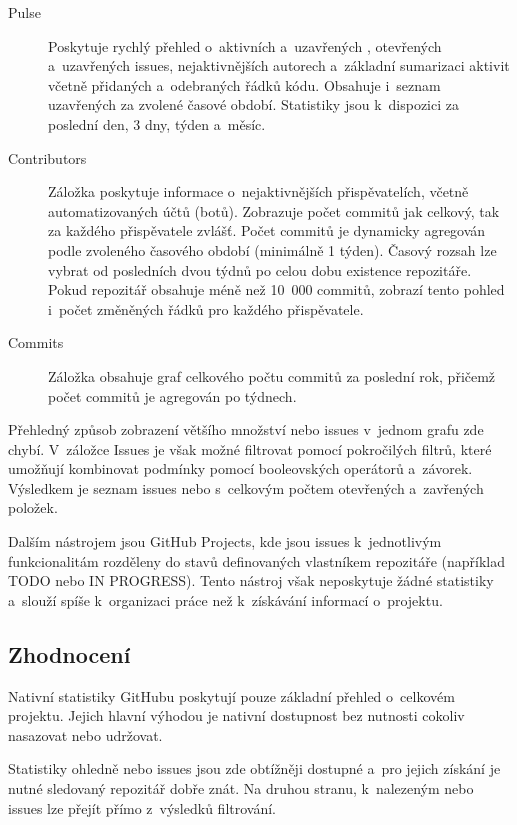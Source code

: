 \begin{description}
  \item[Pulse] Poskytuje rychlý přehled o~aktivních a~uzavřených \PR, otevřených a~uzavřených issues, nejaktivnějších autorech a~základní sumarizaci aktivit včetně přidaných a~odebraných řádků kódu. Obsahuje i~seznam uzavřených \PR za zvolené časové období. Statistiky jsou k~dispozici za poslední den, 3 dny, týden a~měsíc.
  \item[Contributors] Záložka poskytuje informace o~nejaktivnějších přispěvatelích, včetně automatizovaných účtů (botů). Zobrazuje počet commitů jak celkový, tak za každého přispěvatele zvlášť. Počet commitů je dynamicky agregován podle zvoleného časového období (minimálně 1 týden). Časový rozsah lze vybrat od posledních dvou týdnů po celou dobu existence repozitáře. Pokud repozitář obsahuje méně než 10~000 commitů, zobrazí tento pohled i~počet změněných řádků pro každého přispěvatele.
  \item[Commits] Záložka obsahuje graf celkového počtu commitů za poslední rok, přičemž počet commitů je agregován po týdnech.
\end{description}

Přehledný způsob zobrazení většího množství \PR nebo issues v~jednom grafu zde chybí. V~záložce Issues je však možné filtrovat pomocí pokročilých filtrů, které umožňují kombinovat podmínky pomocí booleovských operátorů a~závorek. Výsledkem je seznam issues nebo \PR s~celkovým počtem otevřených a~zavřených položek.

Dalším nástrojem jsou GitHub Projects, kde jsou issues k~jednotlivým funkcionalitám rozděleny do stavů definovaných vlastníkem repozitáře (například TODO nebo IN PROGRESS). Tento nástroj však neposkytuje žádné statistiky a~slouží spíše k~organizaci práce než k~získávání informací o~projektu.

\subsection*{Zhodnocení}
\label{subsec:github_stats:evaluation}

Nativní statistiky GitHubu poskytují pouze základní přehled o~celkovém projektu. Jejich hlavní výhodou je nativní dostupnost bez nutnosti cokoliv nasazovat nebo udržovat.

Statistiky ohledně \PR nebo issues jsou zde obtížněji dostupné a~pro jejich získání je nutné sledovaný repozitář dobře znát. Na druhou stranu, k~nalezeným \PR nebo issues lze přejít přímo z~výsledků filtrování.

